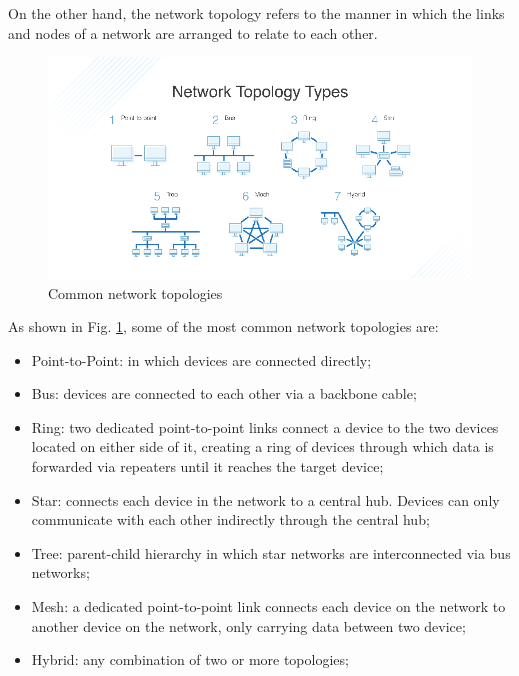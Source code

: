 	On the other hand, the network topology refers to the manner in which the links and nodes of a network are arranged to relate to each other.
	
	\begin{figure}[H]
		\centering
		\includegraphics[width=\textwidth]{resources/img/chap3/network_topologies.png}
		\caption{Common network topologies}
		\label{img:network_topologies}
	\end{figure}
	
	As shown in Fig. \ref{img:network_topologies}, some of the most common network topologies are:
	\begin{itemize}[noitemsep]
		\item Point-to-Point: in which devices are connected directly;
		\item Bus: devices are connected to each other via a backbone cable;
		\item Ring: two dedicated point-to-point links connect a device to the two devices located on either side of it, creating a ring of devices through which data is forwarded via repeaters until it reaches the target device;
		\item Star: connects each device in the network to a central hub. Devices can only communicate with each other indirectly through the central hub;
		\item Tree: parent-child hierarchy in which star networks are interconnected via bus networks;
		\item Mesh: a dedicated point-to-point link connects each device on the network to another device on the network, only carrying data between two device;
		\item Hybrid: any combination of two or more topologies;
	\end{itemize}

